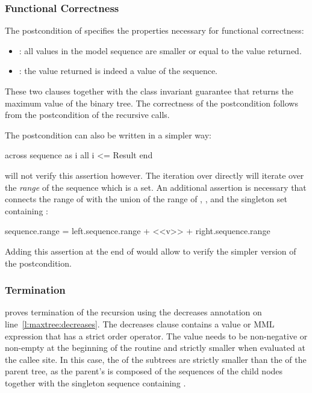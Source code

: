 \subsubsection{Functional Correctness}

The postcondition of  specifies the properties necessary for functional correctness:
\begin{itemize}
\item
{}: all values in the model sequence are smaller or equal to the value returned.

\item
{}: the value returned is indeed a value of the sequence.
\end{itemize}
These two clauses together with the class invariant guarantee that  returns the maximum value of the binary tree. The correctness of the postcondition follows from the postcondition of the recursive calls.

The  postcondition can also be written in a simpler way:
\begin{erunning}
across sequence as i all i <= Result end
\end{erunning}
\AutoProof will not verify this assertion however. The iteration over  directly will iterate over the \emph{range} of the sequence which is a set. An additional assertion is necessary that connects the range of  with the union of the range of , , and the singleton set containing :
\begin{erunning}
sequence.range = left.sequence.range + <<v>> + right.sequence.range
\end{erunning}
Adding this assertion at the end of  would allow \AutoProof to verify the simpler version of the  postcondition.


\subsubsection{Termination}

\AutoProof proves termination of the recursion using the decreases annotation on line~\ref{l:maxtree:decreases}. The decreases clause contains a value or MML expression that has a strict order operator. The value needs to be non-negative or non-empty at the beginning of the routine and strictly smaller when evaluated at the callee site. In this case, the  of the subtrees are strictly smaller than the  of the parent tree, as the parent's  is composed of the sequences of the child nodes together with the singleton sequence containing .



